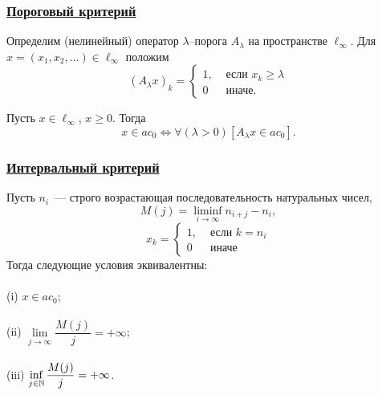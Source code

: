 \begin{frame}\frametitle{\underline{Пороговый критерий}}
	Определим (нелинейный) оператор $\lambda$--порога $A_\lambda$ на пространстве $\ell_\infty$.
	Для $x = (x_1, x_2, ...) \in \ell_\infty$ положим
	\begin{equation}
		(A_\lambda x)_k = \begin{cases}
			1, & \mbox{~если~} x_k \geq \lambda
			\\
			0  & \mbox{~иначе.~}
		\end{cases}
	\end{equation}

	\vfill

	\begin{ttheorem}
		Пусть $x\in\ell_\infty$, $x\geq 0$.
		Тогда
		\begin{equation}
			x\in ac_0 \Leftrightarrow
			\forall(\lambda>0)[A_\lambda x \in ac_0]
			.
		\end{equation}
	\end{ttheorem}
\end{frame}




\begin{frame}\frametitle{\underline{Интервальный критерий}}
		\label{thm:M_j_ac0_inf_lim}
		Пусть $n_i$~--- строго возрастающая последовательность натуральных чисел,
		\begin{equation}
			\label{eq:definition_M_j}
			M(j) = \liminf_{i\to\infty} n_{i+j} - n_i,
		\end{equation}
		\begin{equation}
			x_k = \left\{\begin{array}{ll}
				1, & \mbox{~если~} k = n_i
				\\
				0  & \mbox{~иначе~}
			\end{array}\right.
		\end{equation}
		Тогда следующие условия эквивалентны:
		\\~\\
		(i)   $x \in ac_0$;
		\\~\\
		(ii)  $\lim\limits_{j \to \infty} \dfrac{M(j)}{j} = +\infty$;
		\\~\\
		(iii) $\inf\limits_{j \in \mathbb{N}}     \dfrac{M(j)}{j} = +\infty$.
\end{frame}


